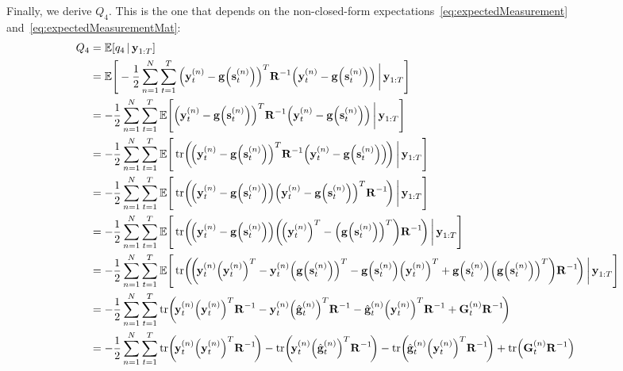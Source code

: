 	Finally, we derive \(Q_4\). This is the one that depends on the non-closed-form expectations~\eqref{eq:expectedMeasurement} and~\eqref{eq:expectedMeasurementMat}:
	\begin{align*}
		Q_4
			&= \E[q_4 \given \vec{y}_{1:T}] \\
			&= \E\Bigg[ -\frac{1}{2} \sum_{n = 1}^{N} \sum_{t = 1}^{T} \Big( \vec{y}_t^{(n)} - \vec{g}\Big(\vec{s}_t^{(n)}\Big) \Big)^T \mat{R}^{-1} \Big( \vec{y}_t^{(n)} - \vec{g}\Big(\vec{s}_t^{(n)}\Big) \Big) \bigggiven \vec{y}_{1:T} \Bigg] \\
			&= -\frac{1}{2} \sum_{n = 1}^{N} \sum_{t = 1}^{T} \E\Bigg[ \Big( \vec{y}_t^{(n)} - \vec{g}\Big(\vec{s}_t^{(n)}\Big) \Big)^T \mat{R}^{-1} \Big( \vec{y}_t^{(n)} - \vec{g}\Big(\vec{s}_t^{(n)}\Big) \Big) \bigggiven \vec{y}_{1:T} \Bigg] \\
			&= -\frac{1}{2} \sum_{n = 1}^{N} \sum_{t = 1}^{T} \E\Bigg[ \tr\!\bigg(\!\Big( \vec{y}_t^{(n)} - \vec{g}\Big(\vec{s}_t^{(n)}\Big) \Big)^T \mat{R}^{-1} \Big( \vec{y}_t^{(n)} - \vec{g}\Big(\vec{s}_t^{(n)}\Big) \Big)\!\bigg) \bigggiven \vec{y}_{1:T} \Bigg] \\
			&= -\frac{1}{2} \sum_{n = 1}^{N} \sum_{t = 1}^{T} \E\Bigg[ \tr\!\bigg(\!\Big( \vec{y}_t^{(n)} - \vec{g}\Big(\vec{s}_t^{(n)}\Big) \Big) \Big( \vec{y}_t^{(n)} - \vec{g}\Big(\vec{s}_t^{(n)}\Big) \Big)^T \mat{R}^{-1} \!\bigg) \bigggiven \vec{y}_{1:T} \Bigg] \\
			&= -\frac{1}{2} \sum_{n = 1}^{N} \sum_{t = 1}^{T} \E\Bigg[ \tr\!\bigg(\!\Big( \vec{y}_t^{(n)} - \vec{g}\Big(\vec{s}_t^{(n)}\Big) \Big) \bigg(\!\Big(\vec{y}_t^{(n)}\Big)^T - \Big(\vec{g}\Big(\vec{s}_t^{(n)}\Big)\Big)^T \bigg) \mat{R}^{-1} \!\bigg) \bigggiven \vec{y}_{1:T} \Bigg] \\
			&= -\frac{1}{2} \sum_{n = 1}^{N} \sum_{t = 1}^{T} \E\Bigg[ \tr\!\bigg(\!\bigg(\! \vec{y}_t^{(n)} \Big(\vec{y}_t^{(n)}\Big)^T - \vec{y}_t^{(n)} \Big(\vec{g}\Big(\vec{s}_t^{(n)}\Big)\Big)^T - \vec{g}\Big(\vec{s}_t^{(n)}\Big) \Big(\vec{y}_t^{(n)}\Big)^T + \vec{g}\Big(\vec{s}_t^{(n)}\Big) \Big(\vec{g}\Big(\vec{s}_t^{(n)}\Big)\Big)^T \bigg) \mat{R}^{-1} \!\bigg) \bigggiven \vec{y}_{1:T} \Bigg] \\
			&= -\frac{1}{2} \sum_{n = 1}^{N} \sum_{t = 1}^{T} \tr\!\bigg(\! \vec{y}_t^{(n)} \Big(\vec{y}_t^{(n)}\Big)^T \mat{R}^{-1} - \vec{y}_t^{(n)} \Big(\hat{\vec{g}}_t^{(n)}\Big)^T \mat{R}^{-1} - \hat{\vec{g}}_t^{(n)} \Big(\vec{y}_t^{(n)}\Big)^T \mat{R}^{-1} + \mat{G}_t^{(n)} \mat{R}^{-1} \!\bigg) \\
			&= -\frac{1}{2} \sum_{n = 1}^{N} \sum_{t = 1}^{T} \tr\!\bigg(\! \vec{y}_t^{(n)} \Big(\vec{y}_t^{(n)}\Big)^T \mat{R}^{-1} \!\bigg) - \tr\!\bigg(\! \vec{y}_t^{(n)} \Big(\hat{\vec{g}}_t^{(n)}\Big)^T \mat{R}^{-1} \!\bigg) - \tr\!\bigg(\! \hat{\vec{g}}_t^{(n)} \Big(\vec{y}_t^{(n)}\Big)^T \mat{R}^{-1} \!\bigg) + \tr\!\Big( \mat{G}_t^{(n)} \mat{R}^{-1} \Big) \\
	\end{align*}
	
